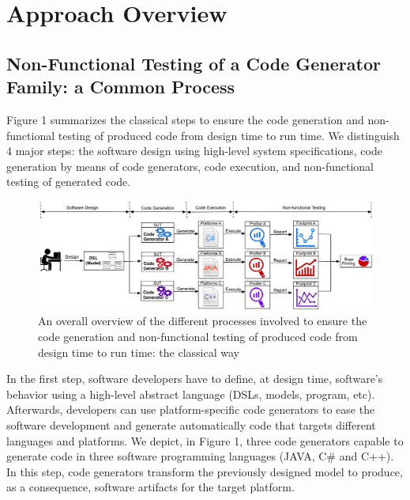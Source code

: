 \vspace*{-0.3 cm}

\section{Approach Overview}


\subsection{Non-Functional Testing of a Code Generator Family: a Common Process}

Figure 1 summarizes the classical steps to ensure the code generation and non-functional testing of produced code from design time to run time. 
We distinguish 4 major steps: the software design using high-level system specifications, code generation by means of code generators, code execution, and non-functional testing of generated code. 


\begin{figure}[t]
		\center
		
	\includegraphics[width=0.95\linewidth]{Ressources/background.pdf}
	\caption{An overall overview of the different processes involved to ensure the code generation and non-functional testing of produced code from design time to run time: the classical way}
\end{figure}


In the first step, software developers have to define, at design time, software's behavior using a high-level abstract language (DSLs, models, program, etc). Afterwards, developers can use platform-specific code generators to ease the software development and generate automatically code that targets different languages and platforms. We depict, in Figure 1, three code generators capable to generate code in three software programming languages (JAVA, C\# and C++). In this step, code generators transform the previously designed model to produce, as a consequence, software artifacts for the target platform.

